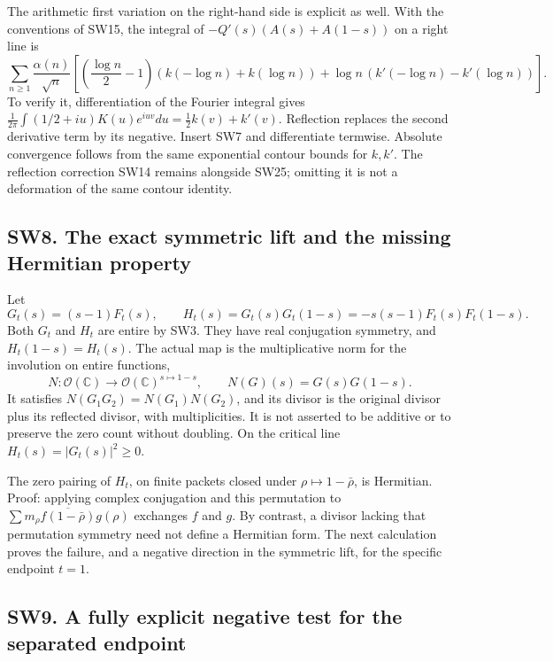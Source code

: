 \documentclass[
  10pt,
  a4paper,
]{article}
\begin{document}
The arithmetic first variation on the right-hand side is explicit as
well. With the conventions of SW15, the integral of
\(-Q'(s)(A(s)+A(1-s))\) on a right line is \[
\sum_{n\ge1}\frac{\alpha(n)}{\sqrt n}
\left[
\left(\frac{\log n}2-1\right)(k(-\log n)+k(\log n))
+\log n\,(k'(-\log n)-k'(\log n))
\right].
\tag{SW25}
\] To verify it, differentiation of the Fourier integral gives
\(\frac1{2\pi}\int(1/2+iu)K(u)e^{iuv}du=\tfrac12 k(v)+k'(v)\).
Reflection replaces the second derivative term by its negative. Insert
SW7 and differentiate termwise. Absolute convergence follows from the
same exponential contour bounds for \(k,k'\). The reflection correction
SW14 remains alongside SW25; omitting it is not a deformation of the
same contour identity.

\subsection{SW8. The exact symmetric lift and the missing Hermitian
property}\label{sw8.-the-exact-symmetric-lift-and-the-missing-hermitian-property}

Let \[
G_t(s)=(s-1)F_t(s),\qquad
H_t(s)=G_t(s)G_t(1-s)=-s(s-1)F_t(s)F_t(1-s).
\tag{SW26}
\] Both \(G_t\) and \(H_t\) are entire by SW3. They have real
conjugation symmetry, and \(H_t(1-s)=H_t(s)\). The actual map is the
multiplicative norm for the involution on entire functions, \[
N:\mathcal O(\mathbb C)\longrightarrow\mathcal O(\mathbb C)^{s\mapsto1-s},
\qquad N(G)(s)=G(s)G(1-s).
\tag{SW27}
\] It satisfies \(N(G_1G_2)=N(G_1)N(G_2)\), and its divisor is the
original divisor plus its reflected divisor, with multiplicities. It is
not asserted to be additive or to preserve the zero count without
doubling. On the critical line \(H_t(s)=|G_t(s)|^2\ge0\).

The zero pairing of \(H_t\), on finite packets closed under
\(\rho\mapsto1-\bar\rho\), is Hermitian. Proof: applying complex
conjugation and this permutation to
\(\sum m_\rho\overline{f(1-\bar\rho)}g(\rho)\) exchanges \(f\) and
\(g\). By contrast, a divisor lacking that permutation symmetry need not
define a Hermitian form. The next calculation proves the failure, and a
negative direction in the symmetric lift, for the specific endpoint
\(t=1\).

\subsection{SW9. A fully explicit negative test for the separated
endpoint}\label{sw9.-a-fully-explicit-negative-test-for-the-separated-endpoint}
\end{document}
